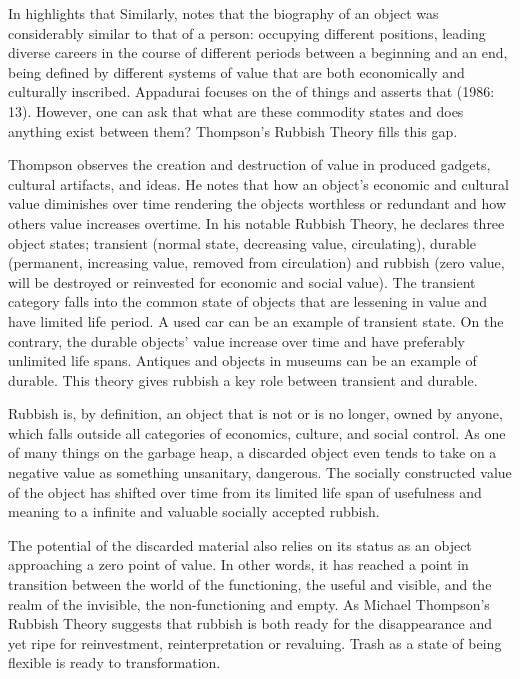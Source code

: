 In  \citet[3]{appadurai1988social} highlights that  Similarly, \cite{kopytoff1986cultural} notes that the biography of an object was considerably similar to that of a person: occupying different positions, leading diverse careers in the course of different periods between a beginning and an end, being defined by different systems of value that are both economically and culturally inscribed. Appadurai focuses on the  of things and asserts that  (1986: 13). However, one can ask that what are these commodity states and does anything exist between them? Thompson’s Rubbish Theory fills this gap.

Thompson observes the creation and destruction of value in produced gadgets, cultural artifacts, and ideas. He notes that how an object’s economic and cultural value diminishes over time rendering the objects worthless or redundant and how others value increases overtime. In his notable Rubbish Theory, he declares three object states; transient (normal state, decreasing value, circulating), durable (permanent, increasing value, removed from circulation) and rubbish (zero value, will be destroyed or reinvested for economic and social value). The transient category falls into the common state of objects that are lessening in value and have limited life period. A used car can be an example of transient state. On the contrary, the durable objects’ value increase over time and have preferably unlimited life spans. Antiques and objects in museums can be an example of durable. This theory gives rubbish a key role between transient and durable.

Rubbish is, by definition, an object that is not or is no longer, owned by anyone, which falls outside all categories of economics, culture, and social control. As one of many things on the garbage heap, a discarded object even tends to take on a negative value as something unsanitary, dangerous. The socially constructed value of the object has shifted over time from its limited life span of usefulness and meaning to a infinite and valuable socially accepted rubbish.

The potential of the discarded material also relies on its status as an object approaching a zero point of value. In other words, it has reached a point in transition between the world of the functioning, the useful and visible, and the realm of the invisible, the non-functioning and empty. As Michael Thompson’s Rubbish Theory suggests that rubbish is both ready for the disappearance and yet ripe for reinvestment, reinterpretation or revaluing. Trash as a state of being flexible is ready to transformation.

